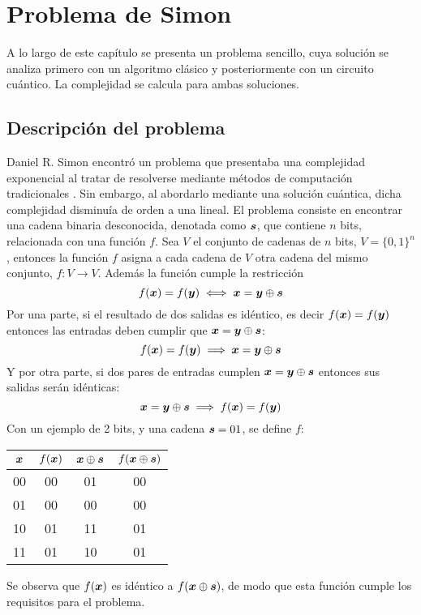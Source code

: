 \chapter{Problema de Simon}

A lo largo de este capítulo se presenta un problema sencillo, cuya solución se 
analiza primero con un algoritmo clásico y posteriormente con un circuito 
cuántico. La complejidad se calcula para ambas soluciones.

\section{Descripción del problema}

Daniel R. Simon encontró un problema que presentaba una complejidad exponencial 
al tratar de resolverse mediante métodos de computación tradicionales 
\cite{simon94}. Sin embargo, al abordarlo mediante una solución cuántica, dicha 
complejidad disminuía de orden a una lineal.
%
El problema consiste en encontrar una cadena binaria desconocida, denotada como 
$\boldsymbol{s}$, que contiene $n$ bits, relacionada con una función $f$. Sea $V$ el 
conjunto de cadenas de $n$ bits, $V = \{0,1\}^n$, entonces la función $f$ asigna 
a cada cadena de $V$ otra cadena del mismo conjunto, $f:V \rightarrow V$.
%
Además la función cumple la restricción
%
\begin{equation}
	\label{eq:simon_f}
	f(\boldsymbol{x}) = f(\boldsymbol{y}) \iff \boldsymbol{x} = \boldsymbol{y} \oplus \boldsymbol{s}
\end{equation}
%
Por una parte, si el resultado de dos salidas es idéntico, es decir $f(\boldsymbol{x}) = 
f(\boldsymbol{y})$ entonces las entradas deben cumplir que $\boldsymbol{x} = \boldsymbol{y} \oplus \boldsymbol{s}$:
%
$$ f(\boldsymbol{x}) = f(\boldsymbol{y}) \implies \boldsymbol{x} = \boldsymbol{y} \oplus \boldsymbol{s} $$
%
Y por otra parte, si dos pares de entradas cumplen $\boldsymbol{x} = \boldsymbol{y} \oplus \boldsymbol{s}$ 
entonces sus salidas serán idénticas:
%
$$ \boldsymbol{x} = \boldsymbol{y} \oplus \boldsymbol{s} \implies f(\boldsymbol{x}) = f(\boldsymbol{y}) $$
%
Con un ejemplo de 2 bits, y una cadena $\boldsymbol{s} = 01$, se define $f$:
%
\begin{center}
\begin{tabular}{cccc}
	\toprule
	$\boldsymbol{x}$ & $f(\boldsymbol{x})$ & $\boldsymbol{x} \oplus \boldsymbol{s}$ & $f(\boldsymbol{x} \oplus \boldsymbol{s})$\\
	\midrule
	00 & 00 & 01 & 00\\
	01 & 00 & 00 & 00\\
	10 & 01 & 11 & 01\\
	11 & 01 & 10 & 01\\
	\bottomrule
\end{tabular}
\end{center}
%
Se observa que $f(\boldsymbol{x})$ es idéntico a $f(\boldsymbol{x} \oplus \boldsymbol{s})$, de modo que esta 
función cumple los requisitos para el problema.


